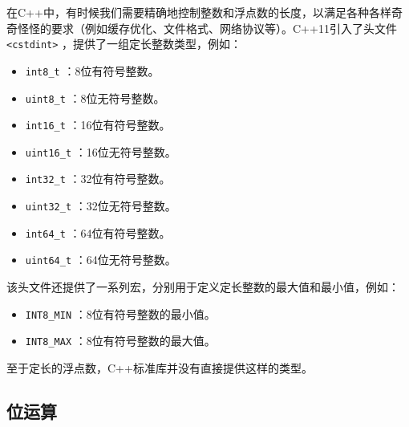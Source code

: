 在C++中，有时候我们需要精确地控制整数和浮点数的长度，以满足各种各样奇奇怪怪的要求（例如缓存优化、文件格式、网络协议等）。C++11引入了头文件 \texttt{<cstdint>} ，提供了一组定长整数类型，例如：
\begin{itemize}
  \item  \texttt{int8\_t} ：8位有符号整数。
  \item  \texttt{uint8\_t} ：8位无符号整数。
  \item  \texttt{int16\_t} ：16位有符号整数。
  \item  \texttt{uint16\_t} ：16位无符号整数。
  \item  \texttt{int32\_t} ：32位有符号整数。
  \item  \texttt{uint32\_t} ：32位无符号整数。
  \item  \texttt{int64\_t} ：64位有符号整数。
  \item  \texttt{uint64\_t} ：64位无符号整数。
\end{itemize}
该头文件还提供了一系列宏，分别用于定义定长整数的最大值和最小值，例如：
\begin{itemize}
  \item  \texttt{INT8\_MIN} ：8位有符号整数的最小值。
  \item  \texttt{INT8\_MAX} ：8位有符号整数的最大值。
\end{itemize}

至于定长的浮点数，C++标准库并没有直接提供这样的类型。

\subsection{位运算}

